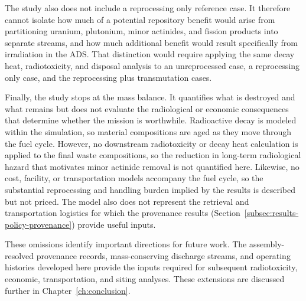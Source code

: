 The study also does not include a reprocessing only reference case. It therefore
cannot isolate how much of a potential repository benefit would arise from
partitioning uranium, plutonium, minor actinides, and fission products into
separate streams, and how much additional benefit would result specifically
from irradiation in the ADS. That distinction would require applying the same
decay heat, radiotoxicity, and disposal analysis to an unreprocessed case, a
reprocessing only case, and the reprocessing plus transmutation cases.

Finally, the study stops at the mass balance. It quantifies what is destroyed and
what remains but does not evaluate the radiological or economic consequences that
determine whether the mission is worthwhile. Radioactive decay is modeled within
the simulation, so material compositions are aged as they move through the fuel
cycle. However, no downstream radiotoxicity or decay heat calculation is applied
to the final waste compositions, so the reduction in long-term radiological
hazard that motivates minor actinide removal is not quantified here. Likewise, no cost,
facility, or transportation models accompany the fuel cycle, so the substantial
reprocessing and handling burden implied by the results is described but not
priced. The model also does not represent the
retrieval and transportation logistics for which the provenance results
(Section~\ref{subsec:results-policy-provenance}) provide useful inputs.

These omissions identify important directions for future work. The
assembly-resolved provenance records, mass-conserving discharge streams, and
operating histories developed here provide the inputs required for subsequent
radiotoxicity, economic, transportation, and siting analyses. These extensions
are discussed further in Chapter~\ref{ch:conclusion}.